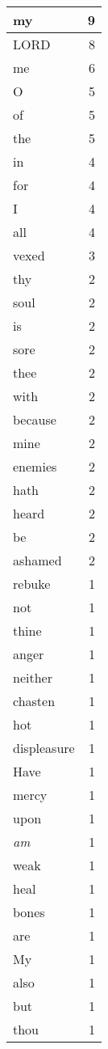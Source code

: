 \begin{center}
\begin{longtable}{l|r}
\hline \hline
\endlastfoot
my & 9 \\ \hline
LORD & 8 \\ \hline
me & 6 \\ \hline
O & 5 \\ \hline
of & 5 \\ \hline
the & 5 \\ \hline
in & 4 \\ \hline
for & 4 \\ \hline
I & 4 \\ \hline
all & 4 \\ \hline
vexed & 3 \\ \hline
thy & 2 \\ \hline
soul & 2 \\ \hline
is & 2 \\ \hline
sore & 2 \\ \hline
thee & 2 \\ \hline
with & 2 \\ \hline
because & 2 \\ \hline
mine & 2 \\ \hline
enemies & 2 \\ \hline
hath & 2 \\ \hline
heard & 2 \\ \hline
be & 2 \\ \hline
ashamed & 2 \\ \hline
rebuke & 1 \\ \hline
not & 1 \\ \hline
thine & 1 \\ \hline
anger & 1 \\ \hline
neither & 1 \\ \hline
chasten & 1 \\ \hline
hot & 1 \\ \hline
displeasure & 1 \\ \hline
Have & 1 \\ \hline
mercy & 1 \\ \hline
upon & 1 \\ \hline
\emph{am} & 1 \\ \hline
weak & 1 \\ \hline
heal & 1 \\ \hline
bones & 1 \\ \hline
are & 1 \\ \hline
My & 1 \\ \hline
also & 1 \\ \hline
but & 1 \\ \hline
thou & 1 \\ \hline

\end{longtable}
\end{center}
